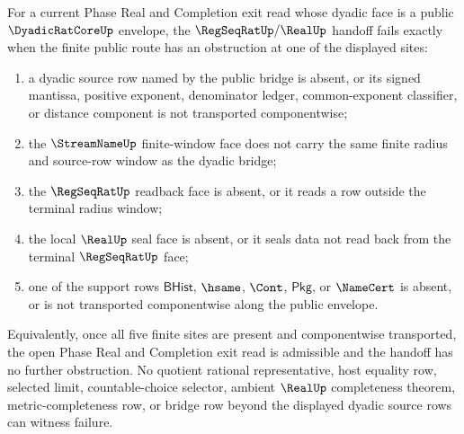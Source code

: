 \begin{theorem}
\label{thm:dyadicratcore-regseqrat-handoff-failure-localization}
For a current Phase Real and Completion exit read whose dyadic face is a public
$\DyadicRatCoreUp$ envelope, the $\RegSeqRatUp/\RealUp$ handoff fails exactly
when the finite public route has an obstruction at one of the displayed sites:
\begin{enumerate}
\item a dyadic source row named by the public bridge is absent, or its signed
mantissa, positive exponent, denominator ledger, common-exponent classifier, or
distance component is not transported componentwise;
\item the $\StreamNameUp$ finite-window face does not carry the same finite
radius and source-row window as the dyadic bridge;
\item the $\RegSeqRatUp$ readback face is absent, or it reads a row outside the
terminal radius window;
\item the local $\RealUp$ seal face is absent, or it seals data not read back
from the terminal $\RegSeqRatUp$ face;
\item one of the support rows $\mathsf{BHist}$, $\hsame$, $\Cont$,
$\mathsf{Pkg}$, or $\NameCert$ is absent, or is not transported componentwise
along the public envelope.
\end{enumerate}
Equivalently, once all five finite sites are present and componentwise
transported, the open Phase Real and Completion exit read is admissible and the
handoff has no further obstruction. No quotient rational representative, host
equality row, selected limit, countable-choice selector, ambient $\RealUp$
completeness theorem, metric-completeness row, or bridge row beyond the
displayed dyadic source rows can witness failure.
\end{theorem}
